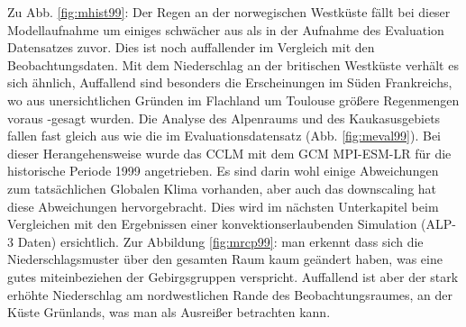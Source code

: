 Zu Abb. \ref{fig:mhist99}: Der Regen an der norwegischen Westküste fällt bei dieser Modellaufnahme um einiges schwächer aus als in der Aufnahme des Evaluation Datensatzes zuvor. Dies ist noch auffallender im Vergleich mit den Beobachtungsdaten. Mit dem Niederschlag an der britischen Westküste verhält es sich ähnlich, Auffallend sind besonders die Erscheinungen im Süden Frankreichs, wo aus unersichtlichen Gründen im Flachland um Toulouse größere Regenmengen \glqq voraus \grqq-gesagt wurden. Die Analyse des Alpenraums und des Kaukasusgebiets fallen fast gleich aus wie die im Evaluationsdatensatz (Abb. \ref{fig:meval99}). Bei dieser Herangehensweise wurde das CCLM mit dem GCM MPI-ESM-LR für die historische Periode 1999 angetrieben. Es sind darin wohl einige Abweichungen zum tatsächlichen Globalen Klima vorhanden, aber auch das downscaling hat diese Abweichungen hervorgebracht. Dies wird im nächsten Unterkapitel beim Vergleichen mit den Ergebnissen einer konvektionserlaubenden Simulation (ALP-3 Daten) ersichtlich. Zur Abbildung \ref{fig:mrcp99}: man erkennt dass sich die Niederschlagsmuster über den gesamten Raum kaum geändert haben, was eine gutes miteinbeziehen der Gebirgsgruppen verspricht. Auffallend ist aber der stark erhöhte Niederschlag am nordwestlichen Rande des Beobachtungsraumes, an der Küste Grünlands, was man als Ausreißer betrachten kann.\\
